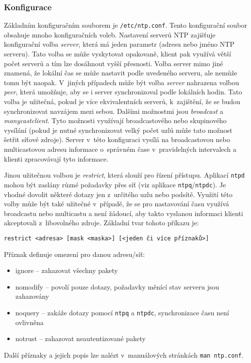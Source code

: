 \subsubsection{Konfigurace}
Základním konfiguračním souborem je {\tt /etc/ntp.conf}. Tento konfigurační soubor obsahuje mnoho
konfiguračních voleb. Nastavení serverů NTP zajišťuje konfigurační volba {\em server}, která má jeden
parametr (adresu nebo jméno NTP serveru). Tato volba se může vyskytovat opakovaně, klient pak využívá
větší počet serverů a tím lze dosáhnout vyšší přesnosti. Volba server mimo jiné znamená, že lokální čas
se může nastavit podle uvedeného serveru, ale nemůže tomu být naopak. V~jiných případech může být volba
{\em server} nahrazena volbou {\em peer}, která umožňuje, aby se i server synchronizoval podle lokálních
hodin. Tato volba je užitečná, pokud je více ekvivalentních serverů, k~zajištění, že se budou
synchronizovat navzájem mezi sebou. Dalšími možnostmi jsou {\em broadcast} a {\em manycastclient}. Tyto
možnosti využívají broadcastového nebo skupinového vysílání (pokud je nutné synchronizovat velký počet
uzlů může tato možnost šetřit síťové zdroje). Server v~této konfiguraci vysílá na broadcastovou nebo
multicastovou adresu informace o~správném čase v~pravidelných intervalech a klienti zpracovávají tyto
informace.

Jinou užitečnou volbou je {\em restrict}, která slouží pro řízení přístupu. Aplikací {\tt ntpd} mohou být zaslány různé požadavky přes síť (viz aplikace {\tt ntpq}/{\tt ntpdc}). Je vhodné dovolit některé dotazy jen z~určitého uzlu nebo podsítě. Využití této volby může být také užitečné v~případě, že se pro nastavování času využívá broadcastu nebo multicastu a není žádoucí, aby takto vyslanou informaci klienti akceptovali z~libovolného zdroje. Základní tvar tohoto příkazu je:
\begin{verbatim}
restrict <adresa> [mask <maska>] [<jeden či více příznaků>]
\end{verbatim}

Příznak definuje omezení pro danou adresu/síť:
\begin{itemize}
  \item ignore -- zahazovat všechny pakety
  \item nomodify -- povolí pouze dotazy, požadavky měnící stav serveru jsou zahazovány
  \item noquery -- zakáže dotazy pomocí {\tt ntpq} a {\tt ntpdc}, synchronizace času není ovlivněna
  \item notrust -- zahazovat neautentizované pakety
\end{itemize}
Další příznaky a jejich popis lze nalézt v~manuálových stránkách {\tt man ntp.conf}.

